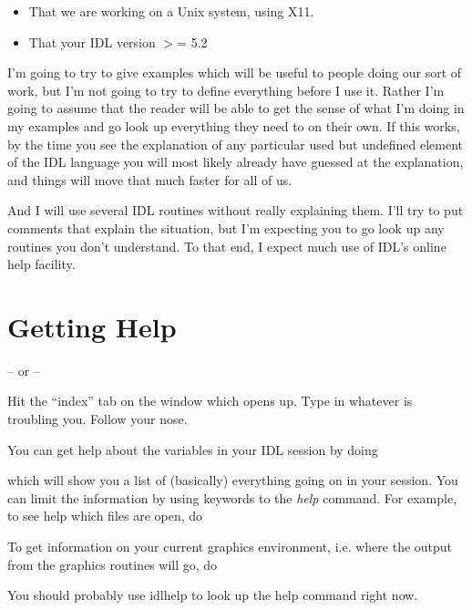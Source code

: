    \begin{itemize}

     \item That we are working on a Unix system, using X11.

     \item That your IDL version $>$= 5.2

   \end{itemize}


   I'm going to try to give examples which will be useful to people
  doing our sort of work, but I'm not going to try to define
  everything before I use it. Rather I'm going to assume that the
  reader will be able to get the sense of what I'm doing in my
  examples and go look up everything they need to on their own. If
  this works, by the time you see the explanation of any particular
  used but undefined element of the IDL language you will most likely
  already have guessed at the explanation, and things will move that
  much faster for all of us.
  
  And I will use several IDL routines without really explaining them.
  I'll try to put comments that explain the situation, but I'm
  expecting you to go look up any routines you don't understand. To
  that end, I expect much use of IDL's online help facility.

\newpage
\section{Getting Help}\label{sec:Getting-Help}


   -- or --


   Hit the ``index'' tab on the window which opens up. Type in
   whatever is troubling you. Follow your nose.

   You can get help about the variables in your IDL session by doing 

   
   which will show you a list of (basically) everything going on in
   your session. You can limit the information by using keywords to
   the \textit{help} command. For example, to see help which files are
   open, do


  To get information on your current graphics environment, i.e. where
  the output from the graphics routines will go, do


  You should probably use idlhelp to look up the help command right now.





